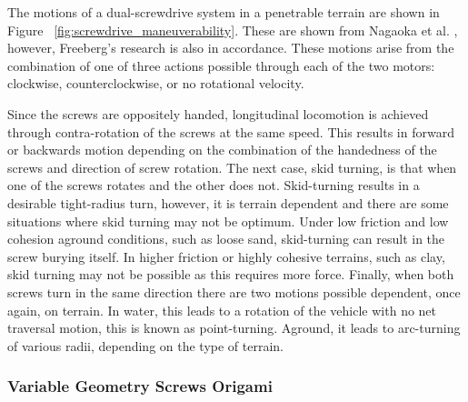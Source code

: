 The motions of a dual-screwdrive system in a penetrable terrain are shown in Figure ~\ref{fig:screwdrive_maneuverability}. These are shown from Nagaoka et al. \cite{Nagaoka2009a}, however, Freeberg's \cite{Freeberg2010} research is also in accordance. These motions arise from the combination of one of three actions possible through each of the two motors: clockwise, counterclockwise, or no rotational velocity. 

Since the screws are oppositely handed, longitudinal locomotion is achieved through contra-rotation of the screws at the same speed. This results in forward or backwards motion depending on the combination of the handedness of the screws and direction of screw rotation. The next case, skid turning, is that when one of the screws rotates and the other does not. Skid-turning results in a desirable tight-radius turn, however, it is terrain dependent and there are some situations where skid turning may not be optimum. Under low friction and low cohesion aground conditions, such as loose sand, skid-turning can result in the screw burying itself. In higher friction or highly cohesive terrains, such as clay, skid turning may not be possible as this requires more force. Finally, when both screws turn in the same direction there are two motions possible dependent, once again, on terrain. In water, this leads to a rotation of the vehicle with no net traversal motion, this is known as point-turning. Aground, it leads to arc-turning of various radii, depending on the type of terrain. %


\subsubsection{Variable Geometry Screws Origami}
\label{sec:screwdrive_variable_pitch}

